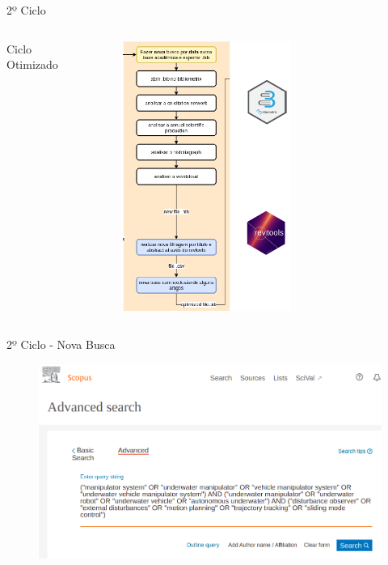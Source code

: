 \begin{frame}{2º Ciclo}
	\begin{columns}
        Ciclo Otimizado
		\begin{figure}[hb]
      \includegraphics[width=0.65\textwidth]{figures/ciclo2.png}
		\end{figure}
	\end{columns}
\end{frame}

\begin{frame}{2º Ciclo - Nova Busca}
  \begin{figure}[hb]
    \includegraphics[width=1\textwidth]{figures/novabusca.png}
  \end{figure}

\end{frame}


